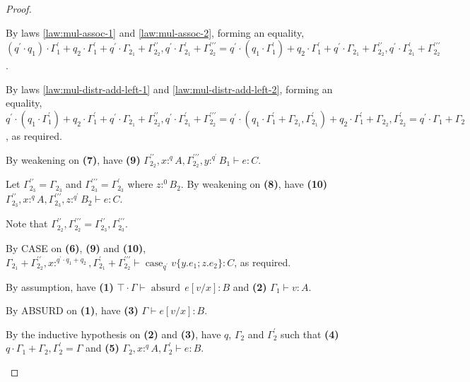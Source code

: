 \documentclass[acmsmall,screen,nonacm]{acmart}
\DeclareMathOperator{\case}{\text{case}}
\DeclareMathOperator{\absurd}{\text{absurd}}
\newcommand{\tee}{\vdash}
\begin{document}
\begin{proof}
\begin{description}
    By laws \ref{law:mul-assoc-1} and \ref{law:mul-assoc-2}, forming an equality, $(q^\prime \cdot q_1) \cdot \Gamma_1^\prime + q_2 \cdot \Gamma_1^\prime + q^\prime \cdot \Gamma_{2_1} + \Gamma_{2_2}^{\prime\prime}, q^\prime \cdot \Gamma_{2_1}^\prime + \Gamma_{2_2}^{\prime\prime\prime} = q^\prime \cdot (q_1 \cdot \Gamma_1^\prime) + q_2 \cdot \Gamma_1^\prime + q^\prime \cdot \Gamma_{2_1} + \Gamma_{2_2}^{\prime\prime}, q^\prime \cdot \Gamma_{2_1}^\prime + \Gamma_{2_2}^{\prime\prime\prime}$. 
    
    By laws \ref{law:mul-distr-add-left-1} and \ref{law:mul-distr-add-left-2}, forming an equality, $q^\prime \cdot (q_1 \cdot \Gamma_1^\prime) + q_2 \cdot \Gamma_1^\prime + q^\prime \cdot \Gamma_{2_1} + \Gamma_{2_2}^{\prime\prime}, q^\prime \cdot \Gamma_{2_1}^\prime + \Gamma_{2_2}^{\prime\prime\prime} = q^\prime \cdot (q_1 \cdot \Gamma_1^\prime + \Gamma_{2_1}, \Gamma_{2_1}^\prime) + q_2 \cdot \Gamma_1^\prime + \Gamma_{2_2}, \Gamma_{2_2}^\prime = q^\prime \cdot \Gamma_1 + \Gamma_2$, as required.
    
    By weakening on \textbf{(7)}, have \textbf{(9)} $\Gamma_{2_2}^{\prime\prime}, x :^q A, \Gamma_{2_2}^{\prime\prime\prime}, y :^{q^\prime} B_1 \tee e : C$.
    
    Let $\Gamma_{2_3}^{\prime\prime} = \Gamma_{2_3}$ and $\Gamma_{2_3}^{\prime\prime\prime} = \Gamma_{2_3}^\prime$ where $z :^0 B_2$. By weakening on \textbf{(8)}, have \textbf{(10)} $\Gamma_{2_3}^{\prime\prime}, x :^q A, \Gamma_{2_3}^{\prime\prime\prime}, z :^{q^\prime} B_2 \tee e : C$.

    Note that $\Gamma_{2_2}^{\prime\prime}, \Gamma_{2_2}^{\prime\prime\prime} = \Gamma_{2_3}^{\prime\prime}, \Gamma_{2_3}^{\prime\prime\prime}$.

    By CASE on \textbf{(6)}, \textbf{(9)} and \textbf{(10)}, $\Gamma_{2_1} + \Gamma_{2_2}^{\prime\prime}, x :^{q^\prime \cdot q_1 + q_2}, \Gamma_{2_1}^\prime + \Gamma_{2_2}^{\prime\prime\prime} \tee \case_{q^\prime} v \{y.e_1; z.e_2\} : C$, as required.
    \\
    \item[Case ABSURD.]
    By assumption, have \textbf{(1)} $\top \cdot \Gamma \tee \absurd \, e[v/x] : B$ and \textbf{(2)} $\Gamma_1 \tee v : A$.

    By ABSURD on \textbf{(1)}, have \textbf{(3)} $\Gamma \tee e[v/x] : B$.

    By the inductive hypothesis on \textbf{(2)} and \textbf{(3)}, have $q$, $\Gamma_2$ and $\Gamma_2^\prime$ such that \textbf{(4)} $q \cdot \Gamma_1 + \Gamma_2, \Gamma_2^\prime = \Gamma$ and \textbf{(5)} $\Gamma_2, x :^q A, \Gamma_2^\prime \tee e : B$.


\end{description}
\end{proof}
\end{document}
